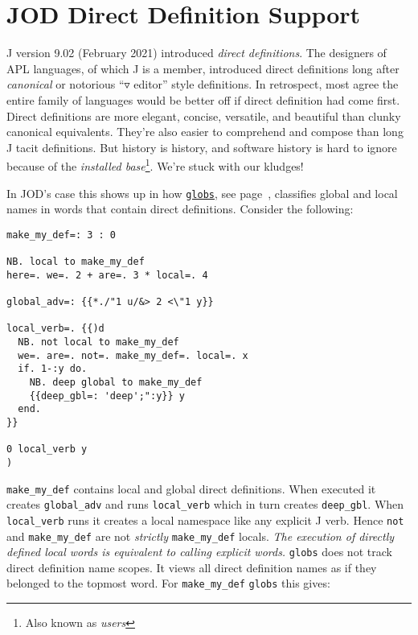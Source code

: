 

\section{JOD Direct Definition Support}\label{ap:jodddef}

J version 9.02 (February 2021) introduced  \emph{direct definitions}. The
designers of APL languages, of which J is a member, introduced direct definitions
long after \emph{canonical} or notorious ``$\pmb\triangledown$ editor'' style definitions. In retrospect,
most agree the entire family of languages would be better off if direct definition
had come first. Direct definitions are more elegant, concise, versatile, and beautiful than
clunky canonical equivalents. They're also easier to comprehend and compose than
long J tacit definitions. But history is history, and software history is hard to ignore because of the \emph{installed base}\footnote{Also known as \emph{users}}.
We're stuck with our kludges!

In JOD's case this shows up in how \hyperlink{il:globs}{\texttt{globs}}, see page~\pageref{ss:globs}, classifies global and local names in words
that contain direct definitions.  Consider the following:


\begin{lstlisting}[frame=single,framerule=0pt,basicstyle=\ttfamily\footnotesize]
make_my_def=: 3 : 0

NB. local to make_my_def
here=. we=. 2 + are=. 3 * local=. 4

global_adv=: {{*./"1 u/&> 2 <\"1 y}}

local_verb=. {{)d
  NB. not local to make_my_def
  we=. are=. not=. make_my_def=. local=. x
  if. 1-:y do.
    NB. deep global to make_my_def
    {{deep_gbl=: 'deep';":y}} y  
  end.
}}

0 local_verb y
)
\end{lstlisting}

\texttt{make\_my\_def} contains local and global direct definitions. When executed it creates  \texttt{global\_adv}
and runs \texttt{local\_verb} which in turn creates \texttt{deep\_gbl}.  When \texttt{local\_verb} runs it creates
a local namespace like any explicit J verb. Hence \texttt{not} and \texttt{make\_my\_def}  are not \emph{strictly} \texttt{make\_my\_def} locals.  \emph{The
execution of  directly defined local words is equivalent to calling explicit words.}  \texttt{globs} does not track direct definition name scopes. 
It views all direct definition names as if they belonged to the topmost word.  For \texttt{make\_my\_def}  \texttt{globs} this gives:

